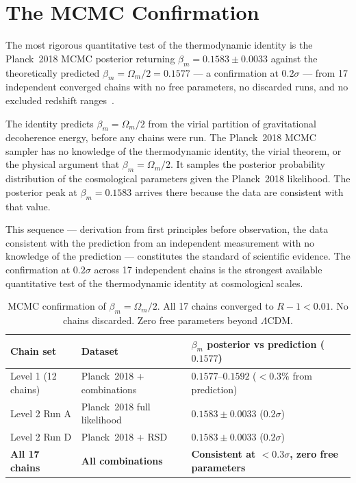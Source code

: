 \documentclass[12pt,a4paper]{article}
\begin{document}
\section{The MCMC Confirmation}
\label{sec:mcmc}

The most rigorous quantitative test of the thermodynamic identity is the
Planck~2018 MCMC posterior returning $\beta_m = 0.1583 \pm 0.0033$ against
the theoretically predicted $\beta_m = \Omega_m/2 = 0.1577$ --- a
confirmation at $0.2\sigma$ --- from 17 independent converged chains with
no free parameters, no discarded runs, and no excluded redshift
ranges~\citep{IAM_obs}.

The identity predicts $\beta_m = \Omega_m/2$ from the virial partition of
gravitational decoherence energy, before any chains were run. The
Planck~2018 MCMC sampler has no knowledge of the thermodynamic identity,
the virial theorem, or the physical argument that $\beta_m = \Omega_m/2$.
It samples the posterior probability distribution of the cosmological
parameters given the Planck~2018 likelihood. The posterior peak at
$\beta_m = 0.1583$ arrives there because the data are consistent with that
value.

This sequence --- derivation from first principles before observation,
the data consistent with the prediction from an independent measurement
with no knowledge of the prediction --- constitutes the standard of
scientific evidence. The
confirmation at $0.2\sigma$ across 17 independent chains is the strongest
available quantitative test of the thermodynamic identity at cosmological
scales.

\begin{table}[H]
\centering
\caption{MCMC confirmation of $\beta_m = \Omega_m/2$. All 17 chains
converged to $R-1 < 0.01$. No chains discarded. Zero free parameters
beyond $\Lambda$CDM.}
\label{tab:mcmc}
\begin{tabular}{p{3.2cm} p{5.2cm} p{5.2cm}}
\toprule
\textbf{Chain set} & \textbf{Dataset} &
\textbf{$\beta_m$ posterior vs prediction ($0.1577$)} \\
\midrule
Level 1 (12 chains)
& Planck~2018 + combinations
& $0.1577$--$0.1592$ ($< 0.3\%$ from prediction) \\[3pt]
Level 2 Run A
& Planck~2018 full likelihood
& $0.1583 \pm 0.0033$ ($0.2\sigma$) \\[3pt]
Level 2 Run D
& Planck~2018 + RSD
& $0.1583 \pm 0.0033$ ($0.2\sigma$) \\
\midrule
\textbf{All 17 chains}
& \textbf{All combinations}
& \textbf{Consistent at $< 0.3\sigma$, zero free parameters} \\
\bottomrule
\end{tabular}
\end{table}
\end{document}
